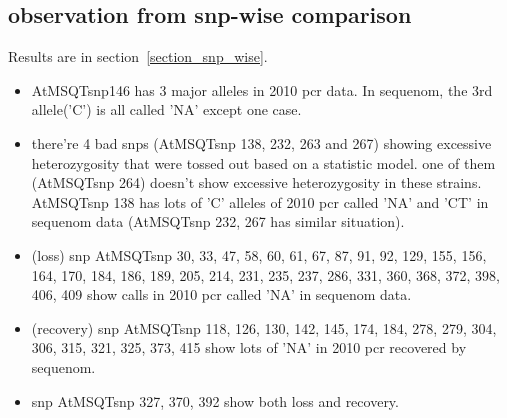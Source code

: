 \documentclass[a3paper,10pt]{article}
\begin{document}
\subsection{observation from snp-wise comparison}
Results are in section~\ref{section_snp_wise}.

\begin{itemize}
 \item AtMSQTsnp146 has 3 major alleles in 2010 pcr data. In sequenom, the 3rd allele('C') is all called 'NA' except one case.
\item there're 4 bad snps (AtMSQTsnp 138, 232, 263 and 267) showing excessive heterozygosity that were tossed out based on a statistic model. one of them (AtMSQTsnp 264) doesn't show excessive heterozygosity in these strains. AtMSQTsnp 138 has lots of 'C' alleles of 2010 pcr called 'NA' and 'CT' in sequenom data (AtMSQTsnp 232, 267 has similar situation).
\item (loss) snp AtMSQTsnp 30, 33, 47, 58, 60, 61, 67, 87, 91, 92, 129, 155, 156, 164, 170, 184, 186, 189, 205, 214, 231, 235, 237, 286, 331, 360, 368, 372, 398, 406, 409 show calls in 2010 pcr called 'NA' in sequenom data.
\item (recovery) snp AtMSQTsnp 118, 126, 130, 142, 145, 174, 184, 278, 279, 304, 306, 315, 321, 325, 373, 415 show lots of 'NA' in 2010 pcr recovered by sequenom.
\item snp AtMSQTsnp 327, 370, 392 show both loss and recovery.

\end{itemize}




\end{document}
